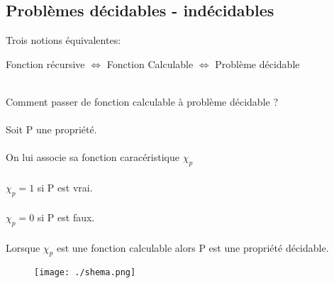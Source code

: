 \documentclass[12pt]{article}   %
\begin{document}
\subsection{Problèmes décidables - indécidables}
Trois notions équivalentes:
\begin{center}
Fonction récursive \begin{math}\Longleftrightarrow\end{math} Fonction Calculable \begin{math}\Longleftrightarrow\end{math} Problème décidable
\end{center}
~\\ Comment passer de fonction calculable à problème décidable ?
\\\\ Soit P une propriété.
\\\\ On lui associe sa fonction caracéristique \begin{math}\chi _{p}\end{math}
\\\\\begin{math}\chi _{p} = 1\end{math} si P est vrai.
\\\\\begin{math}\chi _{p} = 0\end{math} si P est faux.
\\\\Lorsque \begin{math}\chi _{p}\end{math} est une fonction calculable alors P est une propriété décidable.
\begin{figure}[htbp]
	\centering
		\texttt{[image: ./shema.png]}
	\label{fig:shema}
\end{figure}
\end{document}
